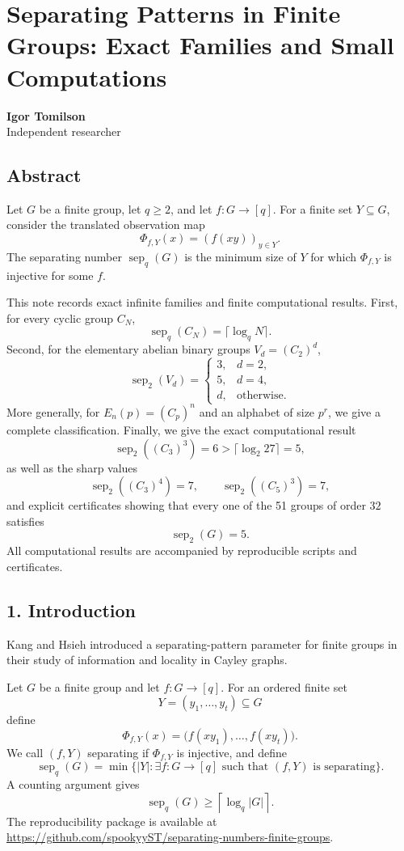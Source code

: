 \documentclass[
]{article}
\author{}
\date{}
\begin{document}
\section{Separating Patterns in Finite Groups: Exact Families and Small Computations}
\textbf{Igor Tomilson}\\
Independent researcher

\subsection{Abstract}
Let \(G\) be a finite group, let \(q\ge 2\), and let \(f:G\to[q]\). For a finite set \(Y\subseteq G\), consider the translated observation map
\[
\Phi_{f,Y}(x)=(f(xy))_{y\in Y}.
\]
The separating number \(\operatorname{sep}_q(G)\) is the minimum size of \(Y\) for which \(\Phi_{f,Y}\) is injective for some \(f\).

This note records exact infinite families and finite computational results. First, for every cyclic group \(C_N\),
\[
\operatorname{sep}_q(C_N)=\lceil \log_q N\rceil.
\]
Second, for the elementary abelian binary groups \(V_d=(C_2)^d\),
\[
\operatorname{sep}_2(V_d)=
\begin{cases}
3,&d=2,\\
5,&d=4,\\
d,&\text{otherwise}.
\end{cases}
\]
More generally, for \(E_n(p)=(C_p)^n\) and an alphabet of size \(p^r\), we give a complete classification. Finally, we give the exact computational result
\[
\operatorname{sep}_2((C_3)^3)=6>\lceil\log_2 27\rceil=5,
\]
as well as the sharp values
\[
\operatorname{sep}_2((C_3)^4)=7,
\qquad
\operatorname{sep}_2((C_5)^3)=7,
\]
and explicit certificates showing that every one of the 51 groups of order \(32\) satisfies
\[
\operatorname{sep}_2(G)=5.
\]
All computational results are accompanied by reproducible scripts and certificates.

\subsection{1. Introduction}
Kang and Hsieh introduced a separating-pattern parameter for finite groups in their study of information and locality in Cayley graphs.

Let \(G\) be a finite group and let \(f:G\to[q]\). For an ordered finite set
\[
Y=(y_1,\ldots,y_t)\subseteq G
\]
define
\[
\Phi_{f,Y}(x)=\bigl(f(xy_1),\ldots,f(xy_t)\bigr).
\]
We call \((f,Y)\) separating if \(\Phi_{f,Y}\) is injective, and define
\[
\operatorname{sep}_q(G)=\min\{|Y|:\exists f:G\to[q]\text{ such that }(f,Y)\text{ is separating}\}.
\]
A counting argument gives
\[
\operatorname{sep}_q(G)\ge\left\lceil\log_q|G|\right\rceil.
\]
The reproducibility package is available at \url{https://github.com/spookyyST/separating-numbers-finite-groups}.
\end{document}
